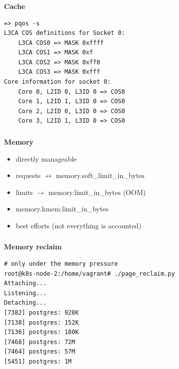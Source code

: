 \documentclass[usenames,dvipsnames, 18pt, compress, aspectratio=169]{beamer}
\begin{document}
\begin{frame}[fragile]{}
    \frametitle{}
    \begin{center}
        \textbf{Cache}

        \begin{flushleft}
		\begin{verbatim}
=> pqos -s
L3CA COS definitions for Socket 0:
	L3CA COS0 => MASK 0xffff
	L3CA COS1 => MASK 0xf
	L3CA COS2 => MASK 0xff0
	L3CA COS3 => MASK 0xfff
Core information for socket 0:
	Core 0, L2ID 0, L3ID 0 => COS0
	Core 1, L2ID 1, L3ID 0 => COS0
	Core 2, L2ID 0, L3ID 0 => COS0
	Core 3, L2ID 1, L3ID 0 => COS0
        \end{verbatim}
        \end{flushleft}

    \end{center}
\end{frame}

\begin{frame}
    \frametitle{}
    \begin{center}
    \textbf{Memory}

        \begin{itemize}[]
            \item directly manageable
            \item requests $\not \to$ memory.soft\_limit\_in\_bytes
            \item limits $\to$ memory.limit\_in\_bytes (OOM)
            \item memory.kmem.limit\_in\_bytes
            \item best efforts (not everything is accounted)
        \end{itemize}

    \end{center}
\end{frame}

\begin{frame}[fragile]{}
    \frametitle{}
    \begin{center}
        \textbf{Memory reclaim}

        \begin{flushleft}
        \begin{verbatim}
# only under the memory pressure
root@k8s-node-2:/home/vagrant# ./page_reclaim.py
Attaching...
Listening...
Detaching...
[7382] postgres: 928K
[7138] postgres: 152K
[7136] postgres: 180K
[7468] postgres: 72M
[7464] postgres: 57M
[5451] postgres: 1M
        \end{verbatim}
        \end{flushleft}

    \end{center}
\end{frame}
\end{document}

